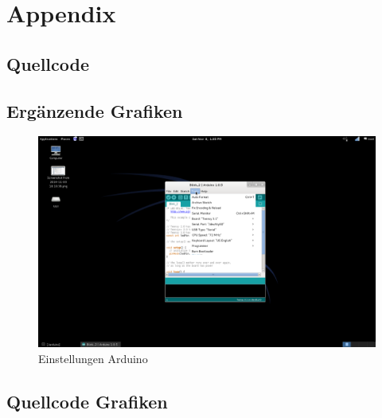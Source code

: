 
\appendix
\chapter{Appendix}
\section{Quellcode}


\lstset{language=C}




\newpage
\section{Ergänzende Grafiken}

\begin{figure}[htbp]
\centering
\includegraphics[width=\textwidth]{bilder/EinstellungenArduino2.png}
\caption{Einstellungen Arduino}
\label{fig:EinstellungenArduino}
\end{figure}

\section{Quellcode Grafiken}
\lstset{language=tikz}




